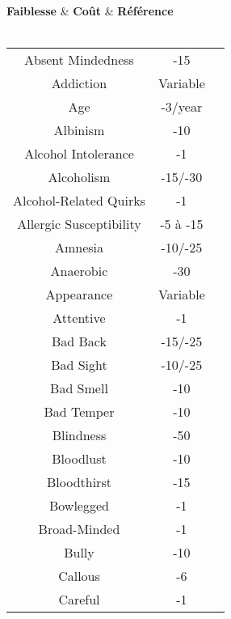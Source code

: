 \begin{center} 
\tablehead
	{\hline \textbf{Faiblesse} & \textbf{Coût} & \textbf{Référence}\\ \hline}
\tabletail
	{\hline {}\\}
\tablelasttail
	{\hline}
\begin{supertabular}{|c|c|c|}
Absent Mindedness & -15 & \cite[p.30]{B} \\ 
Addiction & Variable & \cite[p.30]{B} \\ 
Age & -3/year & \cite[p.27]{B} \\ 
Albinism & -10 & \cite[p.27]{B} \\ 
Alcohol Intolerance & -1 & \cite[p.79]{CI} \\ 
Alcoholism & -15/-30 & \cite[p.30]{B} \\ 
Alcohol-Related Quirks & -1 & \cite[p.79]{CI} \\ 
Allergic Susceptibility & -5 à -15 & \cite[p.96]{CI} \\ 
Amnesia & -10/-25 & \cite[p.86]{B} \\ 
Anaerobic & -30 & \cite[p.101]{CI} \\ 
Appearance & Variable & \cite[p.15]{B} \\ 
Attentive & -1 & \cite[p.86]{CI} \\ 
Bad Back & -15/-25 & \cite[p.80]{CI} \\ 
Bad Sight & -10/-25 & \cite[p.27]{B} \\ 
Bad Smell & -10 & \cite[p.80]{CI} \\ 
Bad Temper & -10 & \cite[p.31]{B} \\ 
Blindness & -50 & \cite[p.27]{B} \\ 
Bloodlust & -10 & \cite[p.31]{B} \\ 
Bloodthirst & -15 & \cite[p.96]{CI} \\ 
Bowlegged & -1 & \cite[p.80]{CI} \\ 
Broad-Minded & -1 & \cite[p.86]{CI} \\ 
Bully & -10 & \cite[31]{B} \\
Callous & -6 & \cite[86]{CI} \\
Careful & -1 & \cite[86]{CI} \\

\end{supertabular}
\end{center}
